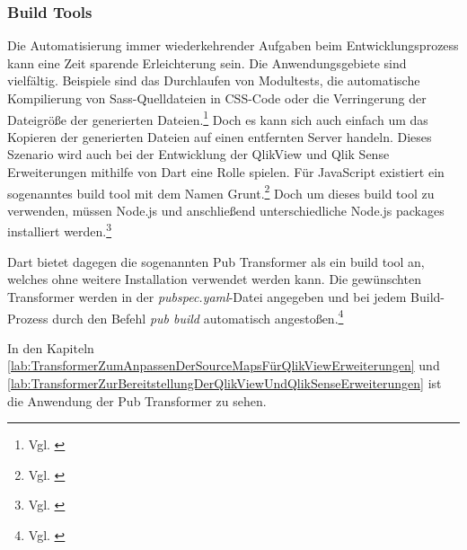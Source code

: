 \subsubsection{Build Tools}


Die Automatisierung immer wiederkehrender Aufgaben beim Entwicklungsprozess kann eine Zeit sparende Erleichterung sein. Die Anwendungsgebiete sind vielfältig. Beispiele sind das Durchlaufen von Modultests, die automatische Kompilierung von Sass-Quell\-dateien in CSS-Code oder die Verringerung der Datei\-größe der generierten Dateien.\footnote{Vgl. \cite[S. 391]{odell2014pro}} Doch es kann sich auch einfach um das Kopieren der generierten Dateien auf einen entfernten Server handeln. Dieses Szenario wird auch bei der Entwicklung der QlikView und Qlik Sense Erweiterungen mithilfe von Dart eine Rolle spielen. 
Für JavaScript existiert ein sogenanntes build tool mit dem Namen Grunt.\footnote{Vgl. \cite[S. 392]{odell2014pro}} Doch um dieses build tool zu verwenden, müssen Node.js und anschließend unterschiedliche Node.js packages installiert werden.\footnote{Vgl. \cite[S. 393]{odell2014pro}}

Dart bietet dagegen die sogenannten Pub Transformer als ein build tool an, welches ohne weitere Installation verwendet werden kann. Die gewünschten Transformer werden in der \textit{pubspec.yaml}-Datei angegeben und bei jedem Build-Prozess durch den Befehl \textit{pub build} automatisch angestoßen.\footnote{Vgl. \cite{AssetsAndTransformers}}

In den Kapiteln \ref{lab:TransformerZumAnpassenDerSourceMapsFürQlikViewErweiterungen} und \ref{lab:TransformerZurBereitstellungDerQlikViewUndQlikSenseErweiterungen}   ist die Anwendung der Pub Transformer zu sehen.












































